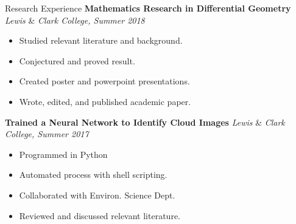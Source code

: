 \documentclass{resume}
\begin{document}
\begin{rSection}{Research Experience}
    \textbf{Mathematics Research in Differential Geometry} \hfill
    \textit{Lewis} \& \textit{Clark College, Summer 2018} 
    \vspace{-3.5mm}
    \begin{multicols}{2}
        \begin{itemize}
            \item Studied relevant literature and background.
            \item Conjectured and proved result.
            \item Created poster and powerpoint presentations.
            \item Wrote, edited, and published academic paper.
        \end{itemize}
    \end{multicols} 
    \vspace{-4mm}
    \textbf{Trained a Neural Network to Identify Cloud Images} \hfill
\textit{Lewis} \& \textit{Clark College, Summer 2017}
    \vspace{-3.5mm}
    \begin{multicols}{2}
        \begin{itemize}
        		\item Programmed in Python
        		\item Automated process with shell scripting.
        		\item Collaborated with Environ. Science Dept.
            \item Reviewed and discussed relevant literature.
        \end{itemize}
    \end{multicols} 
    \vspace{-4mm}
\end{rSection}
\end{document}
